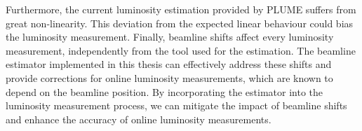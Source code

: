 Furthermore, the current luminosity estimation provided by PLUME suffers from great non-linearity. This deviation from the expected linear behaviour could bias the luminosity measurement. 
Finally, beamline shifts affect every luminosity measurement, independently from the tool used for the estimation. The beamline estimator implemented in this thesis can effectively address these shifts and provide corrections for online luminosity measurements, which are known to depend on the beamline position. By incorporating the estimator into the luminosity measurement process, we can mitigate the impact of beamline shifts and enhance the accuracy of online luminosity measurements.
